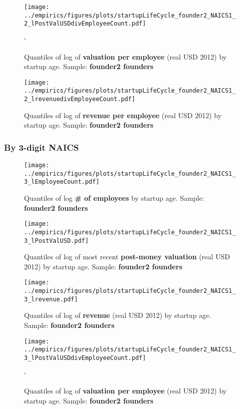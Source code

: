 \documentclass[12pt,english]{article}
\theoremstyle{remark}
\let\Oldsubsubsection\subsubsection
\renewcommand{\subsubsection}{\FloatBarrier\Oldsubsubsection}
\begin{document}
\begin{figure}[!htb]
	\centering
	\texttt{[image: ../empirics/figures/plots/startupLifeCycle\_founder2\_NAICS1\_2\_lPostValUSDdivEmployeeCount.pdf]}
	\caption{Quantiles of log of \textbf{valuation per employee} (real USD 2012) by startup age. 
		Sample: \textbf{founder2 founders}}`
\end{figure}

\begin{figure}[!htb]
	\centering
	\texttt{[image: ../empirics/figures/plots/startupLifeCycle\_founder2\_NAICS1\_2\_lrevenuedivEmployeeCount.pdf]}
	\caption{Quantiles of log of \textbf{revenue per employee} (real USD 2012) by startup age. 
		Sample: \textbf{founder2 founders}}
\end{figure}

\subsubsection{By 3-digit NAICS}

\begin{figure}[!htb]
	\centering
	\texttt{[image: ../empirics/figures/plots/startupLifeCycle\_founder2\_NAICS1\_3\_lEmployeeCount.pdf]}
	\caption{Quantiles of log \textbf{\# of employees} by startup age. 
		Sample: \textbf{founder2 founders}}
\end{figure}

\begin{figure}[!htb]
	\centering
	\texttt{[image: ../empirics/figures/plots/startupLifeCycle\_founder2\_NAICS1\_3\_lPostValUSD.pdf]}
	\caption{Quantiles of log of most recent \textbf{post-money valuation} (real USD 2012) by startup age. 
		Sample: \textbf{founder2 founders}}
\end{figure}

\begin{figure}[!htb]
	\centering
	\texttt{[image: ../empirics/figures/plots/startupLifeCycle\_founder2\_NAICS1\_3\_lrevenue.pdf]}
	\caption{Quantiles of log of \textbf{revenue} (real USD 2012) by startup age. 
		Sample: \textbf{founder2 founders}}
\end{figure}

\begin{figure}[!htb]
	\centering
	\texttt{[image: ../empirics/figures/plots/startupLifeCycle\_founder2\_NAICS1\_3\_lPostValUSDdivEmployeeCount.pdf]}
	\caption{Quantiles of log of \textbf{valuation per employee} (real USD 2012) by startup age. 
		Sample: \textbf{founder2 founders}}`
\end{figure}
\end{document}

